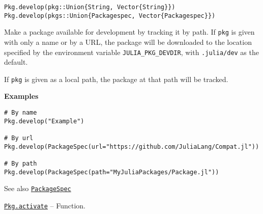 \begin{adjustwidth}{2em}{0pt}


\begin{verbatim}
Pkg.develop(pkg::Union{String, Vector{String}})
Pkg.develop(pkgs::Union{Packagespec, Vector{Packagespec}})
\end{verbatim}

Make a package available for development by tracking it by path. If \texttt{pkg} is given with only a name or by a URL, the package will be downloaded to the location specified by the environment variable \texttt{JULIA\_PKG\_DEVDIR}, with \texttt{.julia/dev} as the default.

If \texttt{pkg} is given as a local path, the package at that path will be tracked.

\textbf{Examples}


\begin{verbatim}
# By name
Pkg.develop("Example")

# By url
Pkg.develop(PackageSpec(url="https://github.com/JuliaLang/Compat.jl"))

# By path
Pkg.develop(PackageSpec(path="MyJuliaPackages/Package.jl"))
\end{verbatim}

See also \hyperlink{7769325907319883786}{\texttt{PackageSpec}}



\end{adjustwidth}
\hypertarget{16970816085069386648}{} 
\hyperlink{16970816085069386648}{\texttt{Pkg.activate}}  -- {Function.}

